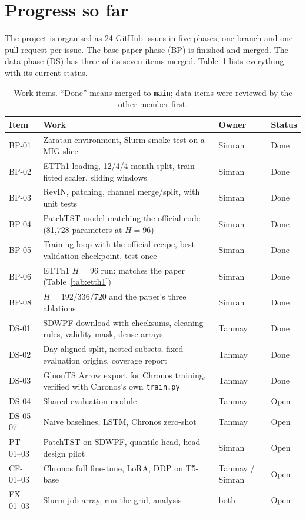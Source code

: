 \documentclass[11pt]{article}
\newcommand{\code}[1]{\texttt{\small #1}}
\begin{document}
\section{Progress so far}
\label{sec:progress}

The project is organised as 24 GitHub issues in five phases, one branch and one pull request per issue. The
base-paper phase (BP) is finished and merged. The data phase (DS) has three of its seven items merged.
Table~\ref{tab:progress} lists everything with its current status.

\begin{table}[t]
\centering\small
\caption{Work items. ``Done'' means merged to \code{main}; data items were reviewed by the other member first.}
\label{tab:progress}
\footnotesize\setlength{\tabcolsep}{4pt}\begin{tabular}{@{}lp{8.9cm}ll@{}}
\toprule
Item & Work & Owner & Status \\
\midrule
BP-01 & Zaratan environment, Slurm smoke test on a MIG slice & Simran & Done \\
BP-02 & ETTh1 loading, 12/4/4-month split, train-fitted scaler, sliding windows & Simran & Done \\
BP-03 & RevIN, patching, channel merge/split, with unit tests & Simran & Done \\
BP-04 & PatchTST model matching the official code (81,728 parameters at $H = 96$) & Simran & Done \\
BP-05 & Training loop with the official recipe, best-validation checkpoint, test once & Simran & Done \\
BP-06 & ETTh1 $H = 96$ run: matches the paper (Table~\ref{tab:etth1}) & Simran & Done \\
BP-08 & $H = 192/336/720$ and the paper's three ablations & Simran & Done \\
\midrule
DS-01 & SDWPF download with checksums, cleaning rules, validity mask, dense arrays & Tanmay & Done \\
DS-02 & Day-aligned split, nested subsets, fixed evaluation origins, coverage report & Tanmay & Done \\
DS-03 & GluonTS Arrow export for Chronos training, verified with Chronos's own \code{train.py} & Tanmay & Done \\
DS-04 & Shared evaluation module & Tanmay & Open \\
DS-05--07 & Naive baselines, LSTM, Chronos zero-shot & Tanmay & Open \\
PT-01--03 & PatchTST on SDWPF, quantile head, head-design pilot & Simran & Open \\
CF-01--03 & Chronos full fine-tune, LoRA, DDP on T5-base & Tanmay / Simran & Open \\
EX-01--03 & Slurm job array, run the grid, analysis & both & Open \\
\bottomrule
\end{tabular}
\end{table}
\end{document}
